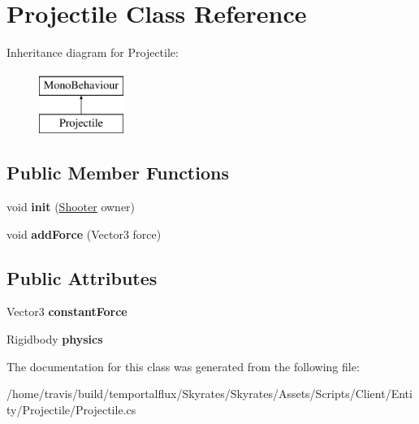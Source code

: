 \hypertarget{class_projectile}{\section{Projectile Class Reference}
\label{class_projectile}
}
Inheritance diagram for Projectile\-:\begin{figure}[H]
\begin{center}
\leavevmode
\includegraphics[height=2.000000cm]{class_projectile}
\end{center}
\end{figure}
\subsection*{Public Member Functions}
\begin{DoxyCompactItemize}
\item 
\hypertarget{class_projectile_a3465c1a31c55962af708b90717f6e451}{void {\bfseries init} (\hyperlink{class_shooter}{Shooter} owner)}\label{class_projectile_a3465c1a31c55962af708b90717f6e451}

\item 
\hypertarget{class_projectile_ae1941a0ed77ae0de87a25594e36d1294}{void {\bfseries add\-Force} (Vector3 force)}\label{class_projectile_ae1941a0ed77ae0de87a25594e36d1294}

\end{DoxyCompactItemize}
\subsection*{Public Attributes}
\begin{DoxyCompactItemize}
\item 
\hypertarget{class_projectile_a330fc169fac1e4007ada5e08e9ae2f87}{Vector3 {\bfseries constant\-Force}}\label{class_projectile_a330fc169fac1e4007ada5e08e9ae2f87}

\item 
\hypertarget{class_projectile_a927ff3dc840abdaf004b9dbc44f0b76b}{Rigidbody {\bfseries physics}}\label{class_projectile_a927ff3dc840abdaf004b9dbc44f0b76b}

\end{DoxyCompactItemize}


The documentation for this class was generated from the following file\-:\begin{DoxyCompactItemize}
\item 
/home/travis/build/temportalflux/\-Skyrates/\-Skyrates/\-Assets/\-Scripts/\-Client/\-Entity/\-Projectile/Projectile.\-cs\end{DoxyCompactItemize}
